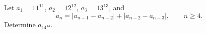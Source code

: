 Let $a_1 = 11^{11}$, $a_2 = 12^{12}$, $a_3 = 13^{13}$, and
\[ a_n = |a_{n-1} - a_{n-2}| + |a_{n-2} - a_{n-3}|, \qquad n \geq 4. \]
Determine $a_{14^{14}}$.
